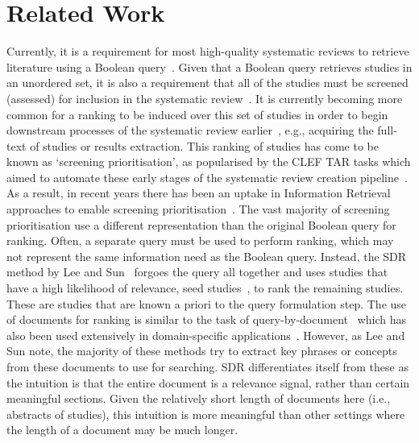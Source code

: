 \vspace{-12pt}
\section{Related Work}
\vspace{-8pt}

Currently, it is a requirement for most high-quality systematic reviews to retrieve literature using a Boolean query~\cite{chandler2019cochrane,suhail2013methods}. Given that a Boolean query retrieves studies in an unordered set, it is also a requirement that all of the studies must be screened (assessed) for inclusion in the systematic review~\cite{chandler2019cochrane}. It is currently becoming more common for a ranking to be induced over this set of studies in order to begin downstream processes of the systematic review earlier~\cite{norman2019measuring}, e.g., acquiring the full-text of studies or results extraction. This ranking of studies has come to be known as `screening prioritisation', as popularised by the CLEF TAR tasks which aimed to automate these early stages of the systematic review creation pipeline~\cite{kanoulas2017clef,kanoulas2018clef,kanoulas2019clef}. As a result, in recent years there has been an uptake in Information Retrieval approaches to enable screening prioritisation~\cite{miwa2014reducing,chen2017ecnu,alharbi2017ranking,wu2018ecnu,alharbi2018retrieving,scells2017ltr,lee2018seed,lagopoulos2018learning,abualsaud2018system,zou2018technology,scells2020clf}. The vast majority of screening prioritisation use a different representation than the original Boolean query for ranking. Often, a separate query must be used to perform ranking, which may not represent the same information need as the Boolean query. Instead, the SDR method by Lee and Sun~\cite{lee2018seed} forgoes the query all together and uses studies that have a high likelihood of relevance, seed studies~\cite{suhail2013methods}, to rank the remaining studies. 
These are studies that are known a priori to the query formulation step. The use of documents for ranking is similar to the task of query-by-document~\cite{yang2009query,lv2011learning} which has also been used extensively in domain-specific applications~\cite{kim2014diversifying,kim2014automatic,kim2015improving}. However, as Lee and Sun note, the majority of these methods try to extract key phrases or concepts from these documents to use for searching. SDR differentiates itself from these as the intuition is that the entire document is a relevance signal, rather than certain meaningful sections. Given the relatively short length of documents here (i.e., abstracts of studies), this intuition is more meaningful than other settings where the length of a document may be much longer.